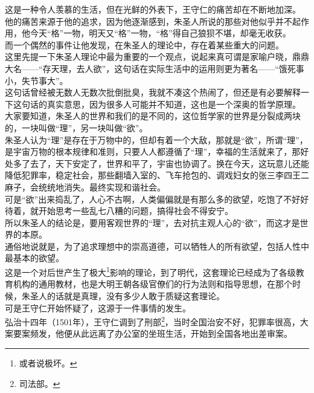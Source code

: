 \begin{multicols}{\theparacolNo}
这是一种令人羡慕的生活，但在光鲜的外表下，王守仁的痛苦却在不断地加深。\\

他的痛苦来源于他的追求，因为他逐渐感到，朱圣人所说的那些对他似乎并不起作用，他今天“格”一物，明天又“格”一物，“格”得自己狼狈不堪，却毫无收获。\\

而一个偶然的事件让他发现，在朱圣人的理论中，存在着某些重大的问题。\\

这里先提一下朱圣人理论中最为重要的一个观点，说起来真可谓是家喻户晓，鼎鼎大名——“存天理，去人欲”，这句话在实际生活中的运用则更为著名——“饿死事小，失节事大”。\\

这句话曾经被无数人无数次批倒批臭，我就不凑这个热闹了，但还是有必要解释一下这句话的真实意思，因为很多人可能并不知道，这也是一个深奥的哲学原理。\\

大家要知道，朱圣人的世界和我们的是不同的，这位哲学家的世界是分裂成两块的，一块叫做“理”，另一块叫做“欲”。\\

朱圣人认为“理”是存在于万物中的，但却有着一个大敌，那就是“欲”，所谓“理”，是宇宙万物的根本规律和准则，只要人人都遵循了“理”，幸福的生活就来了，那好处多了去了，天下安定了，世界和平了，宇宙也协调了。换在今天，这玩意儿还能降低犯罪率，稳定社会，那些翻墙入室的、飞车抢包的、调戏妇女的张三李四王二麻子，会统统地消失。最终实现和谐社会。\\

可是“欲”出来捣乱了，人心不古啊，人类偏偏就是有那么多的欲望，吃饱了不好好待着，就开始思考一些乱七八糟的问题，搞得社会不得安宁。\\

所以朱圣人的结论是，要用客观世界的“理”，去对抗主观人心的“欲”，而这才是世界的本原。\\

通俗地说就是，为了追求理想中的崇高道德，可以牺牲人的所有欲望，包括人性中最基本的欲望。\\

这是一个对后世产生了极大\footnote{或者说极坏。}影响的理论，到了明代，这套理论已经成为了各级教育机构的通用教材，也是大明王朝各级官僚们的行为法则和指导思想，在那个时候，朱圣人的话就是真理，没有多少人敢于质疑这套理论。\\

可是王守仁开始怀疑了，这源于一件事情的发生。\\

弘治十四年（1501年），王守仁调到了刑部\footnote{司法部。}，当时全国治安不好，犯罪率很高，大案要案频发，他便从此远离了办公室的坐班生活，开始到全国各地出差审案。\\


\end{multicols}
